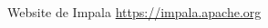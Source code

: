 % 

\begin{thebibliography}{99}


	\emph{} Website de  Impala \url{https://impala.apache.org}	

	
\end{thebibliography}
